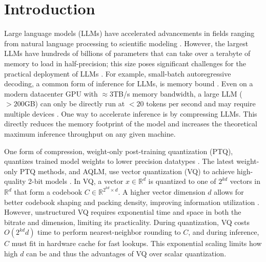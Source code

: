 \section{Introduction}
\label{sec:intro}

Large language models (LLMs) have accelerated advancements in fields ranging from natural language processing \cite{llama2} to scientific modeling \cite{hyenadna}.
However, the largest LLMs have hundreds of billions of parameters that can take over a terabyte of memory to load in half-precision; this size poses significant challenges for the practical deployment of LLMs \cite{llama1,mixtral,falcon}.
For example, small-batch autoregressive decoding, a common form of inference for LLMs, is memory bound \cite{tseng2024quip}.
Even on a modern datacenter GPU with $\approx 3$TB/s memory bandwidth, a large LLM ($> 200$GB) can only be directly run at $<20$ tokens per second and may require multiple devices \cite{tseng2024quip}.
One way to accelerate inference is by compressing LLMs.
This directly reduces the memory footprint of the model and increases the theoretical maximum inference throughput on any given machine. 

One form of compression, weight-only post-training quantization (PTQ), quantizes trained model weights to lower precision datatypes \cite{dettmers2022scaling,tseng2024quip,chee2023quip}.  
The latest \sota weight-only PTQ methods, \qss and AQLM, use vector quantization (VQ) to achieve high-quality 2-bit models \cite{tseng2024quip,aqlm}.
In VQ, a vector $x \in \mathbb{R}^d$ is quantized to one of $2^{kd}$ vectors in $\mathbb{R}^d$ that form a codebook $C \in \mathbb{R}^{2^{kd} \times d}$. 
A higher vector dimension $d$ allows for better codebook shaping and packing density, improving information utilization \cite{6145679}.
However, unstructured VQ requires exponential time and space in both the bitrate and dimension, limiting its practicality.
During quantization, VQ costs $O(2^{kd}d)$ time to perform nearest-neighbor rounding to $C$, and during inference, $C$ must fit in hardware cache for fast lookups.
This exponential scaling limits how high $d$ can be and thus the advantages of VQ over scalar quantization.

